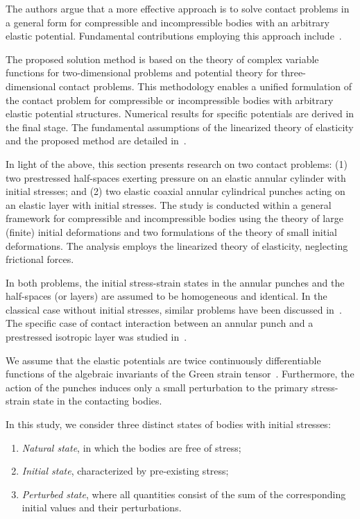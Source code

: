 The authors argue that a more effective approach is to solve contact problems in a general form for compressible and incompressible bodies with an arbitrary elastic potential. Fundamental contributions employing this approach include~\cite{YaretskaRef1,YaretskaRef2,YaretskaRef3,YaretskaRef4,YaretskaRef5,YaretskaRef6,YaretskaRef10,YaretskaRef11,YaretskaRef16}.

The proposed solution method is based on the theory of complex variable functions for two-dimensional problems and potential theory for three-dimensional contact problems. This methodology enables a unified formulation of the contact problem for compressible or incompressible bodies with arbitrary elastic potential structures. Numerical results for specific potentials are derived in the final stage. The fundamental assumptions of the linearized theory of elasticity and the proposed method are detailed in~\cite{YaretskaRef16}.

In light of the above, this section presents research on two contact problems: (1) two prestressed half-spaces exerting pressure on an elastic annular cylinder with initial stresses; and (2) two elastic coaxial annular cylindrical punches acting on an elastic layer with initial stresses. The study is conducted within a general framework for compressible and incompressible bodies using the theory of large (finite) initial deformations and two formulations of the theory of small initial deformations. The analysis employs the linearized theory of elasticity, neglecting frictional forces.

In both problems, the initial stress-strain states in the annular punches and the half-spaces (or layers) are assumed to be homogeneous and identical. In the classical case without initial stresses, similar problems have been discussed in~\cite{YaretskaRef1,YaretskaRef18,YaretskaRef19}. The specific case of contact interaction between an annular punch and a prestressed isotropic layer was studied in~\cite{YaretskaRef20}.

We assume that the elastic potentials are twice continuously differentiable functions of the algebraic invariants of the Green strain tensor~\cite{YaretskaRef1}. Furthermore, the action of the punches induces only a small perturbation to the primary stress-strain state in the contacting bodies.

In this study, we consider three distinct states of bodies with initial stresses: 
\begin{enumerate}
	\item \textit{Natural state}, in which the bodies are free of stress;
	\item \textit{Initial state}, characterized by pre-existing stress;
	\item \textit{Perturbed state}, where all quantities consist of the sum of the corresponding initial values and their perturbations.
\end{enumerate}

